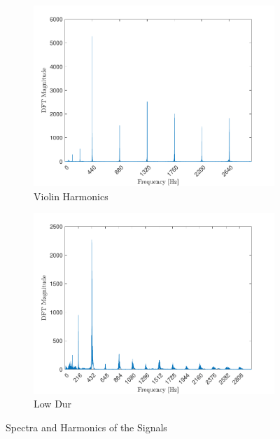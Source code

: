 \documentclass[10pt]{article}
\begin{document}
\begin{figure}[ht]
\begin{subfigure}[b]{0.48\textwidth}
        \includegraphics[width=\textwidth]{problem7_a440_violin_harmonics.pdf}
        \caption{Violin Harmonics}
    \end{subfigure}
    \quad
    \begin{subfigure}[b]{0.48\textwidth}
        \includegraphics[width=\textwidth]{problem7_a440_voice_harmonics.pdf}
        \caption{Low Dur}
    \end{subfigure}
    \caption{Spectra and Harmonics of the Signals\vspace{-0.5cm}}
    \label{note_timbre_harmonics}
\end{figure}
\end{document}
